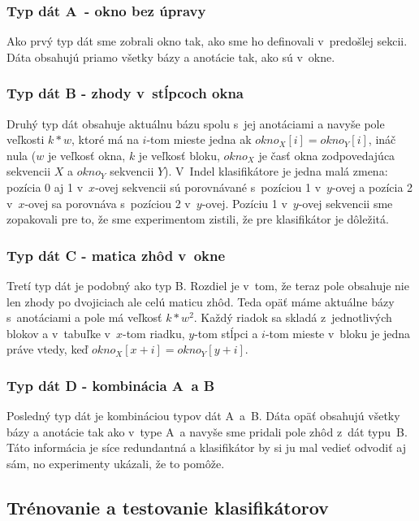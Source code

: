 \subsubsection{Typ dát A~- okno bez úpravy}

Ako prvý typ dát sme zobrali okno tak, ako sme ho definovali v~predošlej sekcii. Dáta obsahujú priamo všetky bázy a anotácie tak, ako sú v~okne.

\subsubsection{Typ dát B - zhody v~stĺpcoch okna}

Druhý typ dát obsahuje aktuálnu bázu spolu s~jej anotáciami a navyše pole veľkosti $k*w$,
ktoré má na $i$-tom mieste jedna ak $okno_X[i] = okno_Y[i]$, ináč nula
($w$ je veľkosť okna, $k$ je veľkosť bloku, $okno_X$ je časť okna zodpovedajúca sekvencii $X$ a $okno_Y$ sekvencii $Y$).
V~Indel klasifikátore je jedna malá zmena: pozícia 0 aj 1 v~$x$-ovej sekvencii sú porovnávané s~pozíciou 1 v~$y$-ovej a pozícia 2 v~$x$-ovej sa porovnáva s~pozíciou 2 v~$y$-ovej.
Pozíciu 1 v~$y$-ovej sekvencii sme zopakovali pre to, že sme experimentom zistili, že pre klasifikátor je dôležitá.

\subsubsection{Typ dát C - matica zhôd v~okne}

Tretí typ dát je podobný ako typ B. Rozdiel je v~tom, že teraz pole obsahuje nie len zhody po dvojiciach ale celú maticu zhôd. Teda opäť máme aktuálne bázy s~anotáciami a pole má veľkosť $k*w^2$. Každý riadok sa skladá z~jednotlivých blokov a v~tabuľke v~$x$-tom riadku, $y$-tom stĺpci a $i$-tom mieste v~bloku je jedna práve
vtedy, keď $okno_X[x+i] = okno_Y[y+i]$.

\subsubsection{Typ dát D - kombinácia A~a B}

Posledný typ dát je kombináciou typov dát A~a~B. Dáta opäť obsahujú všetky bázy a anotácie tak ako v~type A~a navyše sme pridali pole zhôd z~dát typu~B. Táto informácia je síce redundantná a klasifikátor by si ju mal vedieť odvodiť aj sám, no experimenty ukázali, že to pomôže.

\subsection{Trénovanie a testovanie klasifikátorov}

